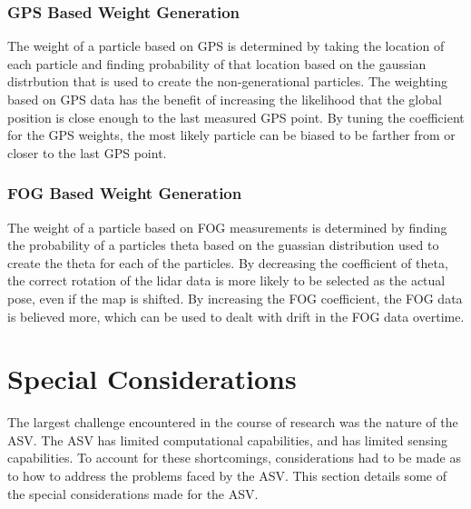 \documentclass[10pt]{IEEEtran}
\begin{document}
\subsubsection{GPS Based Weight Generation}
The weight of a particle based on GPS is determined by taking the location of each particle
and finding probability of that location based on the gaussian distrbution that is used to 
create the non-generational particles.  The weighting based on GPS data has the benefit of 
increasing the likelihood that the global position is close enough to the last measured GPS 
point.  By tuning the coefficient for the GPS weights, the most likely particle can be biased
to be farther from or closer to the last GPS point.

\subsubsection{FOG Based Weight Generation}
The weight of a particle based on FOG measurements is determined by finding the probability
of a particles theta based on the guassian distribution used to create the theta for each of
the particles.  By decreasing the coefficient of theta, the correct rotation of the lidar
data is more likely to be selected as the actual pose, even if the map is shifted.  
By increasing the FOG coefficient, the FOG data is believed more, which can be used to dealt 
with drift in the FOG data overtime.

\section{Special Considerations}
The largest challenge encountered in the course of research was the nature of the ASV.  
The ASV has limited computational capabilities, and has limited sensing capabilities.  
To account for these shortcomings, considerations had to be made as to how to address the
problems faced by the ASV.  This section details some of the special considerations made
for the ASV.
\end{document}
